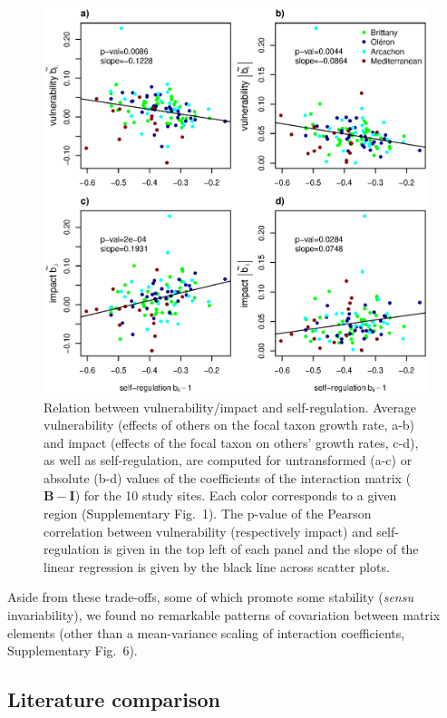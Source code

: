 \documentclass[9pt,twocolumn,twoside,lineno]{pnas-new}
\begin{document}
\begin{figure}[!h]
\centering
\includegraphics[width=17.8cm]{pencen_generality_vs_vulnerability_MainFig}
\caption{Relation between vulnerability/impact and self-regulation.
Average vulnerability (effects of others on the focal taxon growth
rate, a-b) and impact (effects of the focal taxon on others' growth
rates, c-d), as well as self-regulation, are computed for untransformed
(a-c) or absolute (b-d) values of the coefficients of the interaction
matrix ($\mathbf{B}-\mathbf{I}$) for the 10 study sites. Each color
corresponds to a given region (Supplementary Fig.~1). The p-value
of the Pearson correlation between vulnerability (respectively impact)
and self-regulation is given in the top left of each panel and the
slope of the linear regression is given by the black line across scatter
plots.}
\label{fig:Vulnerability_impact}
\end{figure}

Aside from these trade-offs, some of which promote some stability
(\emph{sensu} invariability\cite{Arnoldi431296}), we found no
remarkable patterns of covariation between matrix elements (other
than a mean-variance scaling of interaction coefficients, Supplementary
Fig.~6).

\subsection*{Literature comparison}
\end{document}
